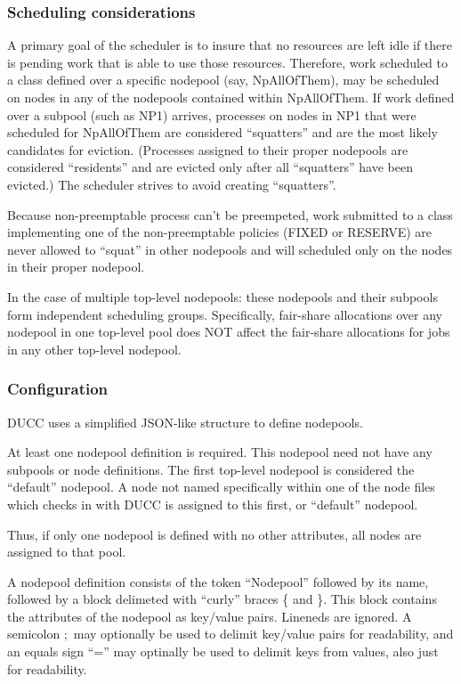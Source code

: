\subsubsection{Scheduling considerations}
    A primary goal of the scheduler is to insure that no resources are left idle if there
    is pending work that is able to use those resources.  Therefore, work scheduled to
    a class defined over a specific nodepool (say, NpAllOfThem), may be scheduled on nodes
    in any of the nodepools contained within NpAllOfThem.  If work defined over a
    subpool (such as NP1) arrives, processes on nodes in NP1 that were scheduled for
    NpAllOfThem are considered ``squatters'' and are the most likely candidates for
    eviction. (Processes assigned to their proper nodepools are considered ``residents''
    and are evicted only after all ``squatters'' have been evicted.)  The scheduler strives
    to avoid creating ``squatters''.

    Because non-preemptable process can't be preempeted, work submitted to a class
    implementing one of the non-preemptable policies (FIXED or RESERVE) are never allowed
    to ``squat'' in other nodepools and will scheduled only on the nodes in their
    proper nodepool.

    In the case of multiple top-level nodepools: these nodepools and their subpools
    form independent scheduling groups.  Specifically, fair-share allocations over any
    nodepool in one top-level pool does NOT affect the fair-share allocations for jobs
    in any other top-level nodepool.

\subsubsection{Configuration}
    DUCC uses a simplified JSON-like structure to define nodepools.

    At least one nodepool definition is required.  This nodepool need not have any subpools or node
    definitions.  The first top-level nodepool is considered the ``default'' nodepool.  A node not
    named specifically within one of the node files which checks in with DUCC is assigned to this
    first, or ``default'' nodepool. 

    Thus, if only one nodepool is defined with no other attributes, all nodes are
    assigned to that pool.

    A nodepool definition consists of the token ``Nodepool'' followed by its
    name, followed by a block delimeted with ``curly'' braces \{ and \}.  This
    block contains the attributes of the nodepool as key/value pairs.
    Lineneds are ignored.  A semicolon $;$ may optionally be used to
    delimit key/value pairs for readability, and an equals sign ``='' may optinally
    be used to delimit keys from values, also just for readability.

